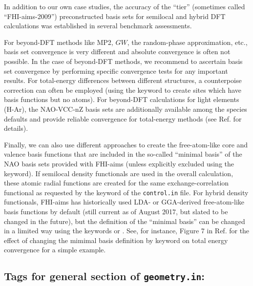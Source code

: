 In addition to our own case studies,\cite{Blum08} the accuracy of the
``tier'' (sometimes called ``FHI-aims-2009''\cite{Zhang2013}) preconstructed basis 
sets for semilocal and hybrid DFT calculations was established in
several benchmark assessments.\cite{Lejaeghereaad3000,Jensen2017}

For beyond-DFT methods like MP2, $GW$, the random-phase approximation,
etc., basis set convergence is very different and absolute convergence
is often not possible. In the case of beyond-DFT methods,
we recommend to ascertain basis set convergence by performing specific convergence
tests for any important results. For total-energy differences between different
structures, a counterpoise correction can often be employed (using the
 keyword to create sites which have basis functions but
no atoms). For beyond-DFT calculations for light elements (H-Ar), the
NAO-VCC-nZ basis sets\cite{Zhang2013} are additionally available among the species 
defaults and provide reliable convergence for total-energy methods
(see Ref. \cite{Zhang2013} for details). 

Finally, we can also use different approaches to create the
free-atom-like core and valence basis functions that are included in
the so-called ``minimal basis'' of the NAO basis sets provided with 
FHI-aims (unless explicitly excluded using the
 keyword). If semilocal density
  functionals are used in the overall calculation, these atomic 
radial functions are created for the same exchange-correlation
functional as requested by the  keyword of the
\texttt{control.in} file. For hybrid density functionals, FHI-aims has 
historically used LDA- or GGA-derived free-atom-like basis functions
by default (still current as of August 2017, but slated to be changed
in the future), but the definition of the ``minimal basis'' can be
changed in a limited way using the keywords
 or . See, for
instance, Figure 7 in Ref. \cite{Ren12a} for the effect of changing
the mimimal basis definition by keyword 
on total energy convergence for a simple example.  

\newpage

\subsection*{Tags for general section of \texttt{geometry.in}:}

